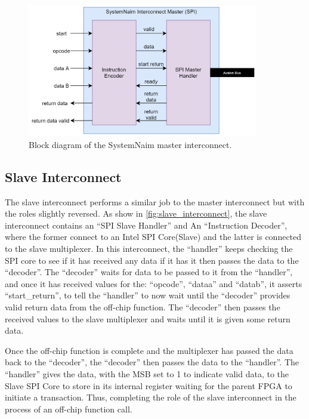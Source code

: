 \begin{figure}[!htb]
    \centering
    \includegraphics[width=0.9\textwidth]{04_Implementation/images/interconnect_block_diagram.png}
    \caption{Block diagram of the SystemNaim master interconnect.}
    \label{fig:master_interconnect}
\end{figure}

\subsection{Slave Interconnect}

The slave interconnect performs a similar job to the master interconnect but with the roles slightly reversed. As show in \autoref{fig:slave_interconnect}, the slave interconnect contains an “SPI Slave Handler” and An “Instruction Decoder”, where the former connect to an Intel SPI Core(Slave) and the latter is connected to the slave multiplexer. In this interconnect, the “handler” keeps checking the SPI core to see if it has received any data if it has it then passes the data to the “decoder”. The “decoder” waits for data to be passed to it from the “handler”, and once it has received values for the: “opcode”, “dataa” and “datab”, it asserts “start\_return”, to tell the “handler” to now wait until the “decoder” provides valid return data from the off-chip function. The “decoder” then passes the received values to the slave multiplexer and waits until it is given some return data.

Once the off-chip function is complete and the multiplexer has passed the data back to the “decoder”, the “decoder” then passes the data to the “handler”. The “handler” gives the data, with the MSB set to 1 to indicate valid data, to the Slave SPI Core to store in its internal register waiting for the parent FPGA to initiate a transaction. Thus, completing the role of the slave interconnect in the process of an off-chip function call.


